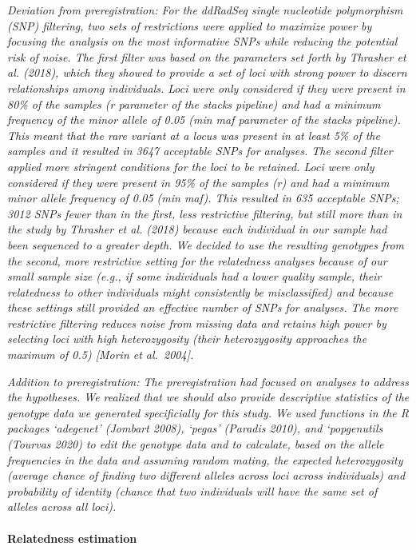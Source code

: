 \documentclass[
]{article}
\begin{document}
\emph{Deviation from preregistration: For the ddRadSeq single nucleotide
polymorphism (SNP) filtering, two sets of restrictions were applied to
maximize power by focusing the analysis on the most informative SNPs
while reducing the potential risk of noise. The first filter was based
on the parameters set forth by Thrasher et al. (2018), which they showed
to provide a set of loci with strong power to discern relationships
among individuals. Loci were only considered if they were present in
80\% of the samples (r parameter of the stacks pipeline) and had a
minimum frequency of the minor allele of 0.05 (min maf parameter of the
stacks pipeline). This meant that the rare variant at a locus was
present in at least 5\% of the samples and it resulted in 3647
acceptable SNPs for analyses. The second filter applied more stringent
conditions for the loci to be retained. Loci were only considered if
they were present in 95\% of the samples (r) and had a minimum minor
allele frequency of 0.05 (min maf). This resulted in 635 acceptable
SNPs; 3012 SNPs fewer than in the first, less restrictive filtering, but
still more than in the study by Thrasher et al. (2018) because each
individual in our sample had been sequenced to a greater depth. We
decided to use the resulting genotypes from the second, more restrictive
setting for the relatedness analyses because of our small sample size
(e.g., if some individuals had a lower quality sample, their relatedness
to other individuals might consistently be misclassified) and because
these settings still provided an effective number of SNPs for analyses.
The more restrictive filtering reduces noise from missing data and
retains high power by selecting loci with high heterozygosity (their
heterozygosity approaches the maximum of 0.5) {[}Morin et al.~2004{]}.}

\emph{Addition to preregistration: The preregistration had focused on
analyses to address the hypotheses. We realized that we should also
provide descriptive statistics of the genotype data we generated
specificially for this study. We used functions in the R packages
`adegenet' (Jombart 2008), `pegas' (Paradis 2010), and `popgenutils
(Tourvas 2020) to edit the genotype data and to calculate, based on the
allele frequencies in the data and assuming random mating, the expected
heterozygosity (average chance of finding two different alleles across
loci across individuals) and probability of identity (chance that two
individuals will have the same set of alleles across all loci).}

\hypertarget{relatedness-estimation}{%
\paragraph{Relatedness estimation}\label{relatedness-estimation}}
\end{document}
